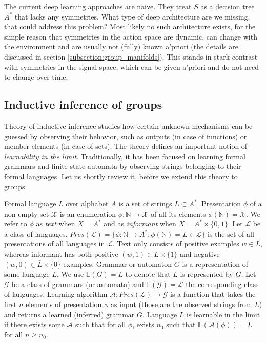 \documentclass[12pt]{article}
\begin{document}
The current deep learning approaches are naive. They treat $S$ as a decision tree $A^*$ that lacks any symmetries. What type of deep architecture are we missing, that could address this problem? Most likely no such architecture exists, for the simple reason that symmetries in the action space are dynamic, can change with the environment and are usually not (fully) known a'priori (the details are discussed in section \ref{subsection:group_manifolds}). This stands in stark contrast with symmetries in the signal space, which can be given a'priori and do not need to change over time.


\subsection{Inductive inference of groups}
Theory of inductive inference \cite{deLaHiguera,SOLOMONOFF19641} studies how certain unknown mechanisms can be guessed by observing their behavior, such as outputs (in case of functions) or member elements (in case of sets). The theory defines an important notion of \textit{learnability in the limit}. Traditionally, it has been focused on learning formal grammars and finite state automata by observing strings belonging to their formal languages. Let us shortly review it, before we extend this theory to groups. 

Formal language $L$ over alphabet $A$ is a set of strings $L\subset A^*$. Presentation $\phi$ of a non-empty set $\mathcal{X}$ is an enumeration $\phi:\mathbb{N}\rightarrow \mathcal{X}$ of all its elements $\phi(\mathbb{N})=\mathcal{X}$. We refer to $\phi$ as \textit{text} when $X=A^*$ and as \textit{informant} when $X=A^*\times \{0,1\}$. Let $\mathcal{L}$ be a class of languages.
 $Pres(\mathcal{L})=\{\phi:\mathbb{N}\rightarrow A^* : \phi(\mathbb{N}) = L \in \mathcal{L}\}$ is the set of all presentations of all languages in $\mathcal{L}$. Text only consists of positive examples $w\in L$, whereas informant has both positive $(w,1) \in L \times \{1\}$ and negative $(w,0) \in \bar{L} \times \{0\}$ examples. Grammar or automaton $G$ is a representation of some language $L$. We use $\mathbb{L}(G)=L$ to denote that $L$ is represented by $G$. Let $\mathcal{G}$ be a class of grammars (or automata) and $\mathbb{L}(\mathcal{G})=\mathcal{L}$ the corresponding class of languages. Learning algorithm $\mathcal{A}:Pres(\mathcal{L})\rightarrow\mathcal{G}$ is a function that takes the first $n$ elements of presentation $\phi$ as input (those are the observed strings from $L$) and returns a learned (inferred) grammar $G$. Language $L$ is learnable in the limit if there exists some $\mathcal{A}$ such that for all $\phi$, exists $n_0$ such that $\mathbb{L}(\mathcal{A}(\phi))=L$ for all $n \ge n_0$.  
\end{document}
